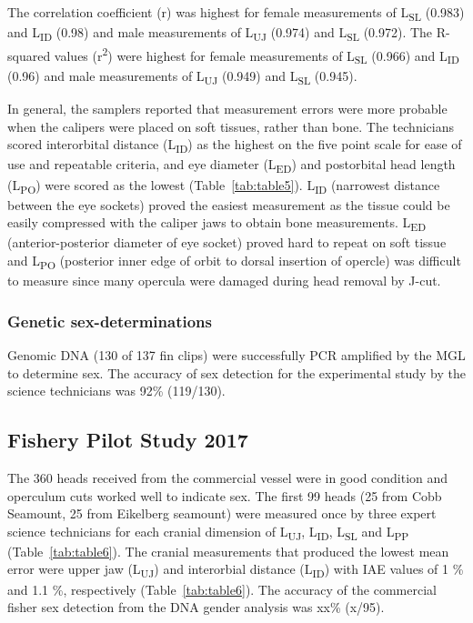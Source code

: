\documentclass[12pt]{article}\usepackage[]{graphicx}\usepackage[]{color}
\begin{document}
The correlation coefficient (r) was highest for female measurements of L\textsubscript{SL} (0.983) and L\textsubscript{ID} (0.98) and male measurements of L\textsubscript{UJ} (0.974) and L\textsubscript{SL} (0.972). The R-squared values (r\textsuperscript{2}) were highest for female measurements of L\textsubscript{SL} (0.966) and L\textsubscript{ID} (0.96) and male measurements of L\textsubscript{UJ} (0.949) and L\textsubscript{SL} (0.945).

In general, the samplers reported that measurement errors were more probable when the calipers were placed on soft tissues, rather than bone. The technicians scored interorbital distance (L\textsubscript{ID}) as the highest on the five point scale for ease of use and repeatable criteria, and eye diameter (L\textsubscript{ED}) and postorbital head length (L\textsubscript{PO}) were scored as the lowest (Table~\ref{tab:table5}). L\textsubscript{ID} (narrowest distance between the eye sockets) proved the easiest measurement as the tissue could be easily compressed with the caliper jaws to obtain bone measurements. L\textsubscript{ED} (anterior-posterior diameter of eye socket) proved hard to repeat on soft tissue and L\textsubscript{PO} (posterior inner edge of orbit to dorsal insertion of opercle) was difficult to measure since many opercula were damaged during head removal by J-cut.

\hypertarget{genetic-sex-determinations}{%
\subsubsection{Genetic sex-determinations}\label{genetic-sex-determinations}}

Genomic DNA (130 of 137 fin clips) were successfully PCR amplified by the MGL to determine sex. The accuracy of sex detection for the experimental study by the science technicians was 92\% (119/130).

\hypertarget{fishery-pilot-study-2017-1}{%
\subsection{Fishery Pilot Study 2017}\label{fishery-pilot-study-2017-1}}

The 360 heads received from the commercial vessel were in good condition and operculum cuts worked well to indicate sex. The first 99 heads (25 from Cobb Seamount, 25 from Eikelberg seamount) were measured once by three expert science technicians for each cranial dimension of L\textsubscript{UJ}, L\textsubscript{ID}, L\textsubscript{SL} and L\textsubscript{PP} (Table~\ref{tab:table6}). The cranial measurements that produced the lowest mean error were upper jaw (L\textsubscript{UJ}) and interorbial distance (L\textsubscript{ID}) with IAE values of 1 \% and 1.1 \%, respectively (Table~\ref{tab:table6}). The accuracy of the commercial fisher sex detection from the DNA gender analysis was xx\% (x/95).
\end{document}
